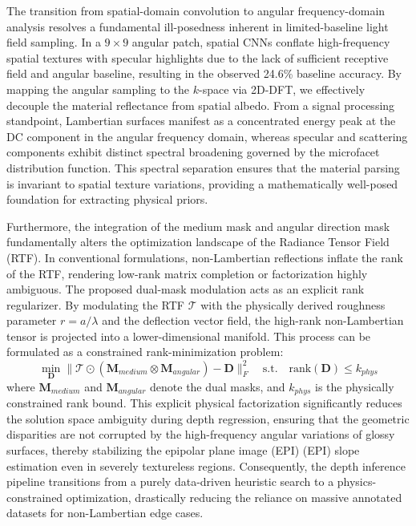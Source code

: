 \documentclass[lettersize,journal]{IEEEtran}
\begin{document}
{The transition from spatial-domain convolution to angular frequency-domain analysis resolves a fundamental ill-posedness inherent in limited-baseline light field sampling. In a $9 \times 9$ angular patch, spatial CNNs conflate high-frequency spatial textures with specular highlights due to the lack of sufficient receptive field and angular baseline, resulting in the observed 24.6\% baseline accuracy. By mapping the angular sampling to the $k$-space via 2D-DFT, we effectively decouple the material reflectance from spatial albedo. From a signal processing standpoint, Lambertian surfaces manifest as a concentrated energy peak at the DC component in the angular frequency domain, whereas specular and scattering components exhibit distinct spectral broadening governed by the microfacet distribution function. This spectral separation ensures that the material parsing is invariant to spatial texture variations, providing a mathematically well-posed foundation for extracting physical priors.

Furthermore, the integration of the medium mask and angular direction mask fundamentally alters the optimization landscape of the Radiance Tensor Field (RTF). In conventional formulations, non-Lambertian reflections inflate the rank of the RTF, rendering low-rank matrix completion or factorization highly ambiguous. The proposed dual-mask modulation acts as an explicit rank regularizer. By modulating the RTF $\mathcal{T}$ with the physically derived roughness parameter $r = a/\lambda$ and the deflection vector field, the high-rank non-Lambertian tensor is projected into a lower-dimensional manifold. This process can be formulated as a constrained rank-minimization problem:
\begin{equation}
\label{eq:eq17}
\min_{\mathbf{D}} \|\mathcal{T} \odot (\mathbf{M}_{medium} \otimes \mathbf{M}_{angular}) - \mathbf{D}\|_F^2 \quad \text{s.t.} \quad \text{rank}(\mathbf{D}) \le k_{phys}
\end{equation}
where $\mathbf{M}_{medium}$ and $\mathbf{M}_{angular}$ denote the dual masks, and $k_{phys}$ is the physically constrained rank bound. This explicit physical factorization significantly reduces the solution space ambiguity during depth regression, ensuring that the geometric disparities are not corrupted by the high-frequency angular variations of glossy surfaces, thereby stabilizing the epipolar plane image (EPI) (EPI) slope estimation even in severely textureless regions. Consequently, the depth inference pipeline transitions from a purely data-driven heuristic search to a physics-constrained optimization, drastically reducing the reliance on massive annotated datasets for non-Lambertian edge cases.

}
\end{document}
